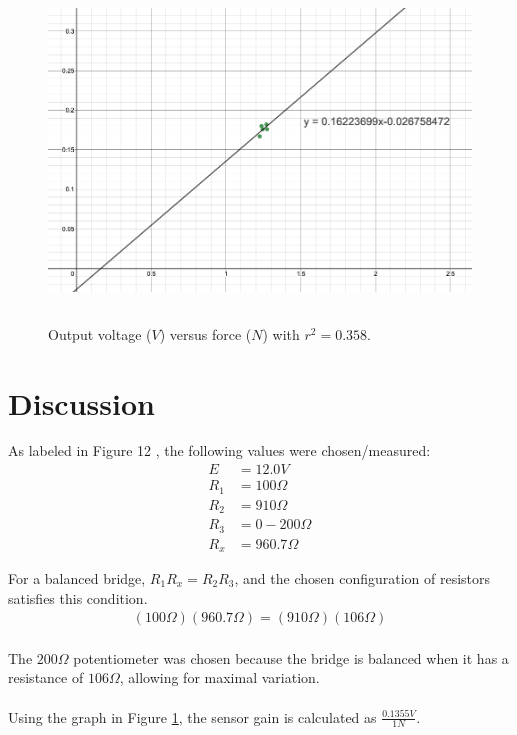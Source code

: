 \documentclass[12pt]{article}
\begin{document}
\begin{figure}[ht]
    \centering
    \includegraphics[height=9cm]{linear_relation.png}
    \caption{Output voltage ($V$) versus force ($N$) with $r^2 = 0.358$.}
    \label{Figure 1}
\end{figure}

\section{Discussion}
As labeled in Figure 12 \cite{labManual}, the following values were chosen/measured:
\begin{align*}
    E   &= 12.0V \\
    R_1 &= 100\Omega \\
    R_2 &= 910\Omega \\
    R_3 &= 0\!-\!200\Omega \\
    R_x &= 960.7\Omega 
\end{align*}

For a balanced bridge, \(R_1R_x = R_2R_3\), and the chosen configuration of resistors satisfies this condition.
\begin{align*}
    \left(100\Omega\right)\left(960.7\Omega\right) = \left(910\Omega\right)\left(106\Omega\right) 
\end{align*}

\paragraph*{}
The \(200\Omega\) potentiometer was chosen because the bridge is balanced when it has a resistance of \(106\Omega\), allowing for maximal variation.

\paragraph*{}
Using the graph in Figure \ref{Figure 1}, the sensor gain is calculated as \(\frac{0.1355V}{1N}\).
\end{document}
